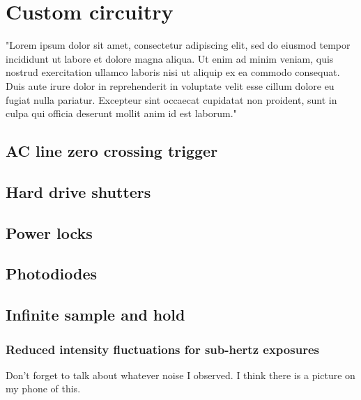 \chapter{Custom circuitry}
"Lorem ipsum dolor sit amet, consectetur adipiscing elit, sed do eiusmod tempor incididunt ut labore et dolore magna aliqua. Ut enim ad minim veniam, quis nostrud exercitation ullamco laboris nisi ut aliquip ex ea commodo consequat. Duis aute irure dolor in reprehenderit in voluptate velit esse cillum dolore eu fugiat nulla pariatur. Excepteur sint occaecat cupidatat non proident, sunt in culpa qui officia deserunt mollit anim id est laborum."

\section{AC line zero crossing trigger}
\section{Hard drive shutters}
\section{Power locks}
\section{Photodiodes}
\section{Infinite sample and hold}
\subsection{Reduced intensity fluctuations for sub-hertz exposures}
Don't forget to talk about whatever noise I observed. I think there is a picture on my phone of this.
